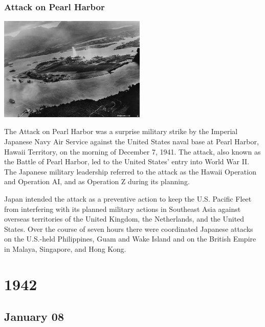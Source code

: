 \documentclass[11pt]{report}
\begin{document}
\subsection{Attack on Pearl Harbor}
\vspace{2mm}\begin{center}\includegraphics[width=7cm]{./img/attackOnPearlHarbor.jpg}\end{center}
The Attack on Pearl Harbor was a surprise military strike by the Imperial Japanese Navy Air Service against the United States naval base at Pearl Harbor, Hawaii Territory, on the morning of December 7, 1941. The attack, also known as the Battle of Pearl Harbor, led to the United States' entry into World War II. The Japanese military leadership referred to the attack as the Hawaii Operation and Operation AI, and as Operation Z during its planning.

Japan intended the attack as a preventive action to keep the U.S. Pacific Fleet from interfering with its planned military actions in Southeast Asia against overseas territories of the United Kingdom, the Netherlands, and the United States. Over the course of seven hours there were coordinated Japanese attacks on the U.S.-held Philippines, Guam and Wake Island and on the British Empire in Malaya, Singapore, and Hong Kong.

\chapter{1942}
\section{January 08}
\end{document}
